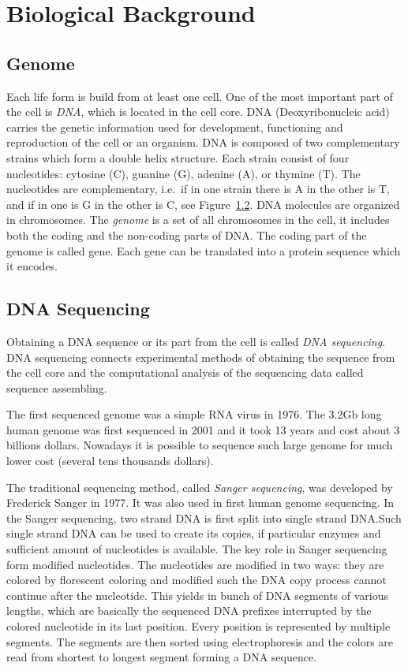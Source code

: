 \chapter{Biological Background}\label{chap:biointro}

\section{Genome}

Each life form is build from at least one cell. One of the most important part of the cell is \emph{DNA}, which is located in the cell core.
DNA (Deoxyribonucleic acid) carries the genetic information used for development, functioning and reproduction of the cell or an organism.
DNA is composed of two complementary strains which form a double helix structure. Each strain consist of four nucleotides: cytosine (C), guanine (G), adenine (A), or thymine (T).
The nucleotides are complementary, i.e.\ if in one strain there is A in the other is T, and if in one is G in the other is C, see Figure~\ref{}.
DNA molecules are organized in chromosomes.
The \emph{genome} is a set of all chromosomes in the cell, it includes both the coding and the non-coding parts of DNA.\@
The coding part of the genome is called gene. Each gene can be translated into a protein sequence which it encodes.

\section{DNA Sequencing}

Obtaining a DNA sequence or its part from the cell is called \emph{DNA sequencing}.
DNA sequencing connects experimental methods of obtaining the sequence from the cell core and the computational analysis of the sequencing data called sequence assembling.

The first sequenced genome was a simple RNA virus in 1976. The 3.2Gb long human genome was first sequenced in 2001 and it took 13 years and cost about 3 billions dollars. Nowadays it is possible to sequence such large genome for much lower cost (several tens thousands dollars).

The traditional sequencing method, called \emph{Sanger sequencing}, was developed by Frederick Sanger in 1977\cite{sanger1977dna}. It was also used in first human genome sequencing.
In the Sanger sequencing, two strand DNA is first split into single strand DNA.\@ Such single strand DNA can be used to create its copies, if particular enzymes and sufficient amount of nucleotides is available. The key role in Sanger sequencing form modified nucleotides. The nucleotides are modified in two ways: they are colored by florescent coloring and modified such the DNA copy process cannot continue after the nucleotide. This yields in bunch of DNA segments of various lengths, which are basically the sequenced DNA prefixes interrupted by the colored nucleotide in its last position. Every position is represented by multiple segments. The segments are then sorted using electrophoresis and the colors are read from shortest to longest segment forming a DNA sequence.

